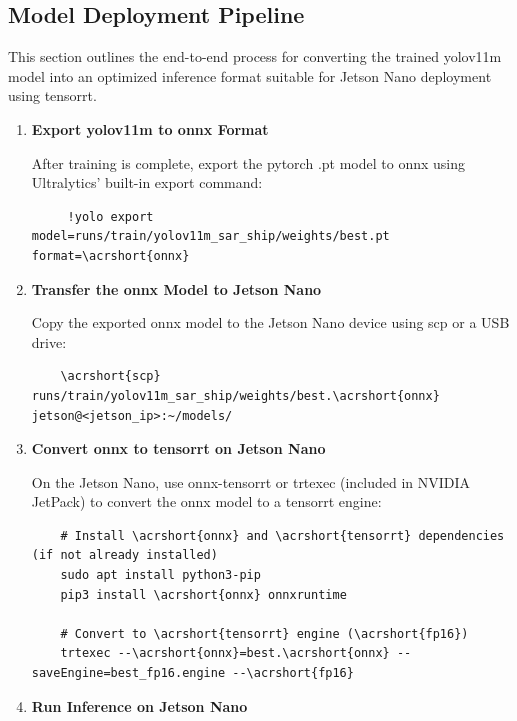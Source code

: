 \documentclass{article}
\begin{document}
\subsection{Model Deployment Pipeline}
This section outlines the end-to-end process for converting the trained \acrshort{yolov11m} model into an optimized inference format suitable for Jetson Nano deployment using \acrshort{tensorrt}. \begin{enumerate}
    \item \textbf{Export \acrshort{yolov11m} to \acrshort{onnx} Format}
    
    After training is complete, export the \acrshort{pytorch} .pt model to \acrshort{onnx} using Ultralytics’ built-in export command:
    \begin{lstlisting}
     !yolo export model=runs/train/yolov11m_sar_ship/weights/best.pt format=\acrshort{onnx}
     \end{lstlisting}
    \item \textbf{Transfer the \acrshort{onnx} Model to Jetson Nano}
    
    Copy the exported \acrshort{onnx} model to the Jetson Nano device using \acrshort{scp} or a USB drive:
    \begin{lstlisting}
    \acrshort{scp} runs/train/yolov11m_sar_ship/weights/best.\acrshort{onnx} jetson@<jetson_ip>:~/models/
    \end{lstlisting}
   
    
     
    \item \textbf{Convert \acrshort{onnx} to \acrshort{tensorrt} on Jetson Nano}
    
     On the Jetson Nano, use \acrshort{onnx}-\acrshort{tensorrt} or trtexec (included in NVIDIA JetPack) to convert the \acrshort{onnx} model to a \acrshort{tensorrt} engine:
    \begin{lstlisting}
    # Install \acrshort{onnx} and \acrshort{tensorrt} dependencies (if not already installed)
    sudo apt install python3-pip
    pip3 install \acrshort{onnx} onnxruntime
   
    # Convert to \acrshort{tensorrt} engine (\acrshort{fp16})
    trtexec --\acrshort{onnx}=best.\acrshort{onnx} --saveEngine=best_fp16.engine --\acrshort{fp16}
    \end{lstlisting}
 
   
 
    \item \textbf{Run Inference on Jetson Nano}
    

\end{enumerate}
\end{document}

